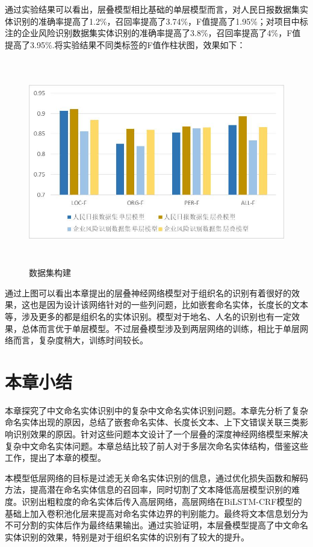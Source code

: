 \documentclass[winfonts,master,oneside,nobackinfo]{njuthesis}
\begin{document}
通过实验结果可以看出，层叠模型相比基础的单层模型而言，对人民日报数据集实体识别的准确率提高了1.2\%，召回率提高了3.74\%，F值提高了1.95\%；对项目中标注的企业风险识别数据集实体识别的准确率提高了3.8\%，召回率提高了4\%，F值提高了3.95\%.将实验结果不同类标签的F值作柱状图，效果如下：

\begin{figure}[H]
\centering
\begin{minipage}[t]{\textwidth}
\includegraphics[width=1\textwidth,height=9cm]{./figure/层叠模型F值比较.jpg}
\caption{数据集构建}
\label{lab:1}
\end{minipage}
\end{figure}

通过上图可以看出本章提出的层叠神经网络模型对于组织名的识别有着很好的效果，这也是因为设计该网络针对的一些列问题，比如嵌套命名实体，长度长的文本等，涉及更多的都是组织名的实体识别。模型对于地名、人名的识别也有一定效果，总体而言优于单层模型。不过层叠模型涉及到两层网络的训练，相比于单层网络而言，复杂度稍大，训练时间较长。

\section{本章小结}

本章探究了中文命名实体识别中的复杂中文命名实体识别问题。本章先分析了复杂命名实体出现的原因，总结了嵌套命名实体、长度长文本、上下文错误关联三类影响识别效果的原因。针对这些问题本文设计了一个层叠的深度神经网络模型来解决复杂中文命名实体问题。本章总结比较了前人对于多层次命名实体结构，借鉴这些工作，提出了本章的模型。

本模型低层网络的目标是过滤无关命名实体识别的信息，通过优化损失函数和解码方法，提高潜在命名实体信息的召回率，同时切割了文本降低高层模型识别的难度。识别出粗粒度的命名实体后传入高层网络，高层网络在BiLSTM-CRF模型的基础上加入卷积池化层来提高对命名实体边界的判别能力。最终将文本信息划分为不可分割的实体后作为最终结果输出。通过实验证明，本层叠模型提高了中文命名实体识别的效果，特别是对于组织名实体的识别有了较大的提升。
\end{document}
